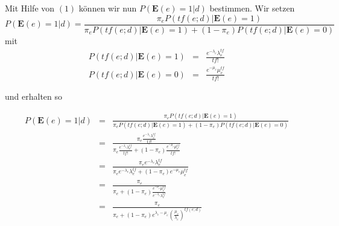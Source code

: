 Mit Hilfe von $(1)$ können wir nun $P(\textbf{E}(e)=1|d)$ bestimmen. Wir setzen
\[ P(\textbf{E}(e)=1|d) = \frac{\pi_e P(tf(e;d)|\textbf{E}(e)=1)}{\pi_e P(tf(e;d)|\textbf{E}(e)=1) + (1-\pi_e) P(tf(e;d)|\textbf{E}(e)=0)} \]
mit
\begin{eqnarray*}
	P(tf(e;d)|\textbf{E}(e)=1) &=& \frac{e^{-\lambda_e}\lambda_e^{tf}}{tf!}\\
	P(tf(e;d)|\textbf{E}(e)=0) &=& \frac{e^{-\mu_e}\mu_e^{tf}}{tf!}
\end{eqnarray*}

und erhalten so

\begin{eqnarray*}
	P(\textbf{E}(e)=1|d) 	&=& 	\frac{\pi_e P(tf(e;d)|\textbf{E}(e)=1)}{\pi_e P(tf(e;d)|\textbf{E}(e)=1) + (1-\pi_e) P(tf(e;d)|\textbf{E}(e)=0)} \\
	&=&	\frac{\pi_e \frac{e^{-\lambda_e}\lambda_e^{tf}}{tf!}}{\pi_e \frac{e^{-\lambda_e}\lambda_e^{tf}}{tf!} + (1 - \pi_e) \frac{e^{-\mu_e}\mu_e^{tf}}{tf!}}\\
	&=&	\frac{\pi_e{e^{-\lambda_e}\lambda_e^{tf}}}{\pi_e {e^{-\lambda_e}\lambda_e^{tf}} + (1 - \pi_e) e^{-\mu_e}\mu_e^{tf}}\\
	&=&	\frac{\pi_e}{\pi_e + (1-\pi_e)\frac{e^{-\mu_e}\mu_e^{tf}}{e^{-\lambda_e}\lambda_e^{tf}}}\\
	&=&	\frac{\pi_e}{\pi_e + (1-\pi_e)e^{\lambda_e - \mu_e}\left( \frac{\mu_e}{\lambda_e}\right)^{tf(e;d)}}	
\end{eqnarray*}

